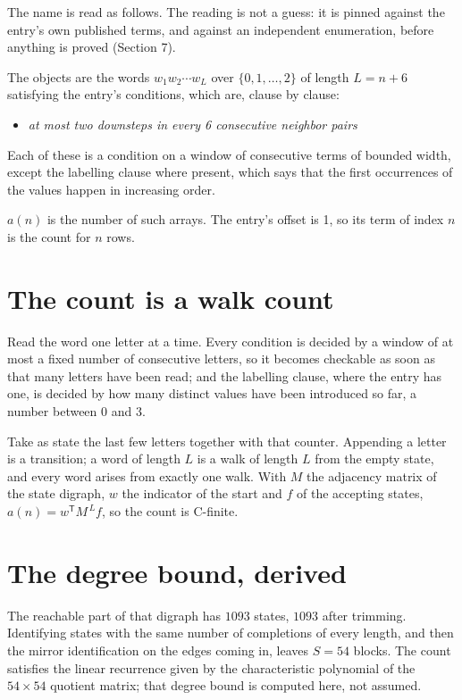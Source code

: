 \documentclass[11pt]{article}
\theoremstyle{definition}
\begin{document}
The name is read as follows. The reading is not a guess: it is pinned against the entry's own published terms, and against an independent enumeration, before anything is proved (Section 7).

The objects are the words $w_1 w_2 \cdots w_L$ over $\{0,1,\dots,2\}$ of length $L = n + 6$ satisfying the entry's conditions, which are, clause by clause:

\begin{itemize}

\item {\itshape at most two downsteps in every 6 consecutive neighbor pairs}

\end{itemize}

Each of these is a condition on a window of consecutive terms of bounded width, except the labelling clause where present, which says that the first occurrences of the values happen in increasing order.

$a(n)$ is the number of such arrays. The entry's offset is 1, so its term of index $n$ is the count for $n$ rows.

\section{The count is a walk count}

Read the word one letter at a time. Every condition is decided by a window of at most a fixed number of consecutive letters, so it becomes checkable as soon as that many letters have been read; and the labelling clause, where the entry has one, is decided by how many distinct values have been introduced so far, a number between $0$ and 3.

Take as state the last few letters together with that counter. Appending a letter is a transition; a word of length $L$ is a walk of length $L$ from the empty state, and every word arises from exactly one walk. With $M$ the adjacency matrix of the state digraph, $w$ the indicator of the start and $f$ of the accepting states, $a(n) = w^{\mathsf T}M^{\,L}f$, so the count is C-finite.

\section{The degree bound, derived}

The reachable part of that digraph has $1093$ states, $1093$ after trimming. Identifying states with the same number of completions of every length, and then the mirror identification on the edges coming in, leaves $S = 54$ blocks. The count satisfies the linear recurrence given by the characteristic polynomial of the $54\times54$ quotient matrix; that degree bound is computed here, not assumed.
\end{document}
